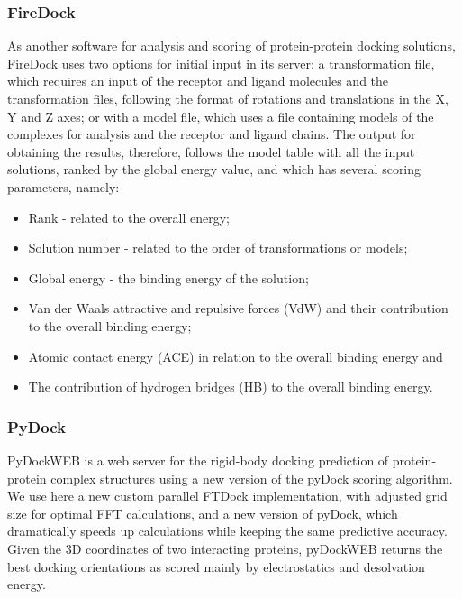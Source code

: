 \documentclass[11pt, letterpaper, english]{article}
\begin{document}
\subsubsection{FireDock}

\par{As another software for analysis and scoring of protein-protein docking solutions, FireDock uses two options for initial input in its server: a transformation file, which requires an input of the receptor and ligand molecules and the transformation files, following the format of rotations and translations in the X, Y and Z axes; or with a model file, which uses a file containing models of the complexes for analysis and the receptor and ligand chains. The output for obtaining the results, therefore, follows the model table with all the input solutions, ranked by the global energy value, and which has several scoring parameters, namely:}

\begin{itemize}
    \item Rank - related to the overall energy; 
    \item Solution number - related to the order of transformations or models; 
    \item Global energy - the binding energy of the solution; 
    \item Van der Waals attractive and repulsive forces (VdW) and their contribution to the overall binding energy;
    \item Atomic contact energy (ACE) in relation to the overall binding energy and 
    \item The contribution of hydrogen bridges (HB) to the overall binding energy.
\end{itemize}

    \subsubsection{PyDock}

    \par{PyDockWEB is a web server for the rigid-body docking prediction of protein-protein complex structures using a new version of the pyDock scoring algorithm. We use here a new custom parallel FTDock implementation, with adjusted grid size for optimal FFT calculations, and a new version of pyDock, which dramatically speeds up calculations while keeping the same predictive accuracy. Given the 3D coordinates of two interacting proteins, pyDockWEB returns the best docking orientations as scored mainly by electrostatics and desolvation energy.}
\end{document}
